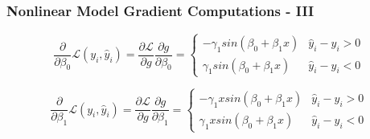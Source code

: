 \documentclass{beamer}
\begin{document}
\begin{frame}
\frametitle{Nonlinear Model Gradient Computations - III}

\[
\frac{\partial}{\partial\beta_{0}}\mathcal{L}(y_{i},\hat{y}_{i})=\frac{\partial\mathcal{L}}{\partial g}\frac{\partial g}{\partial\beta_{0}}=\begin{cases}
-\gamma_{1}sin(\beta_0 + \beta_1x) & \hat{y}_{i}-y_{i}>0\\
\gamma_{1}sin(\beta_0 + \beta_1x) & \hat{y}_{i}-y_{i}<0
\end{cases}
\]

\[
\frac{\partial}{\partial\beta_{1}}\mathcal{L}(y_{i},\hat{y}_{i})=\frac{\partial\mathcal{L}}{\partial g}\frac{\partial g}{\partial\beta_{1}}=\begin{cases}
-\gamma_{1}xsin(\beta_0 + \beta_1x) & \hat{y}_{i}-y_{i}>0\\
\gamma_{1}xsin(\beta_0 + \beta_1x) & \hat{y}_{i}-y_{i}<0
\end{cases}
\]

\end{frame}
\end{document}
